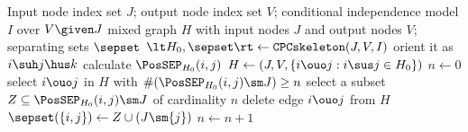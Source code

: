 \begin{algorithm}
  \begin{algorithmic}[1]
  \Input Input node index set $J$; output node index set $V$; conditional independence model $I$ over $V \given J$
  \Output mixed graph $H$ with input nodes $J$ and output nodes $V$; separating sets $\sepset$
  \State $\lt H_0,\sepset \rt \leftarrow \mathtt{CPCskeleton}(J,V,I)$ \label{alg:fci_skeleton2:cpc_skeleton}
   
      \State orient it as $i \suh j \hus k$
    \EndIf
  \EndFor\label{alg:fci_skeleton2:oriented_unshielded_colliders}
   
    \State calculate $\PosSEP_{H_0}(i,j)$
  \EndFor
    \State $H \leftarrow (J,V,\{i \ouo j : i \sus j \in H_0 \})$  \label{alg:fci_skeleton2:construct_skeleton_start}
  \State $n \leftarrow 0$
    \Repeat {}
    \Repeat
    \State select $i \ouo j$ in $H$ with $\#(\PosSEP_{H_0}(i,j)\sm J) \ge n$
    \State select a subset $Z \subseteq \PosSEP_{H_0}(i,j)\sm J$ of cardinality $n$
      \State delete edge $i \ouo j$ from $H$
      \State $\sepset(\{i,j\}) \leftarrow Z \cup (J \sm \{j\})$
    \EndIf
    \State $n \leftarrow n + 1$
    \label{alg:fci_skeleton2:construct_skeleton_end}
  \end{algorithmic}
  \caption{CFCI skeleton algorithm $\mathtt{CFCIskeleton}(J,V,I)$.\label{alg:fci_skeleton}}
\end{algorithm}

